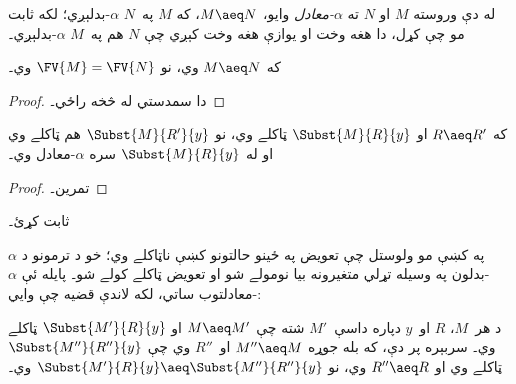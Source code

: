 \documentclass[../../../include/open-logic-section]{subfiles}
\begin{document}
له دې وروسته $M$ او $N$ ته \emph{$\alpha$-معادل} وايو،
$M \aeq N$، که $M$ په~$N$ $\alpha$-بدلېږي؛ لکه ثابت مو چې کړل،
دا هغه وخت او يوازې هغه وخت کېږي چې $N$ هم په~$M$ $\alpha$-بدلېږي۔

\begin{thm}
  که $M \aeq N$ وي، نو $\FV{M} = \FV{N}$ وي۔
\end{thm}

\begin{proof}
  دا سمدستي له  څخه راځي۔
\end{proof}

\begin{lem}
  که $R \aeq R'$ او $\Subst{M}{R}{y}$ ټاکلے وي، نو
  $\Subst{M}{R'}{y}$ هم ټاکلے وي او له
  $\Subst{M}{R}{y}$ سره $\alpha$-معادل وي۔
\end{lem}

\begin{proof}
  تمرين۔
\end{proof}

\begin{prob}
   ثابت کړئ۔
\end{prob}

په  کښې مو ولوستل چې تعويض په ځينو حالتونو
کښې ناټاکلے وي؛ خو د ترمونو د $\alpha$-بدلون په وسيله تړلي
متغيرونه بيا نومولے شو او تعويض ټاکلے کولے شو۔ پايله ئې
$\alpha$-معادلتوب ساتي، لکه لاندې قضيه چې وايي:

\begin{thm}
  د هر~$M$، $R$ او~$y$ دپاره داسې~$M'$ شته چې $M \aeq M'$
  او $\Subst{M'}{R}{y}$ ټاکلے وي۔ سربېره پر دې، که بله جوړه
  $M'' \aeq M$ او~$R''$ وي چې $\Subst{M''}{R''}{y}$ ټاکلے وي
  او $R'' \aeq R$ وي، نو
  $\Subst{M'}{R}{y} \aeq \Subst{M''}{R''}{y}$ وي۔
\end{thm}
\end{document}
